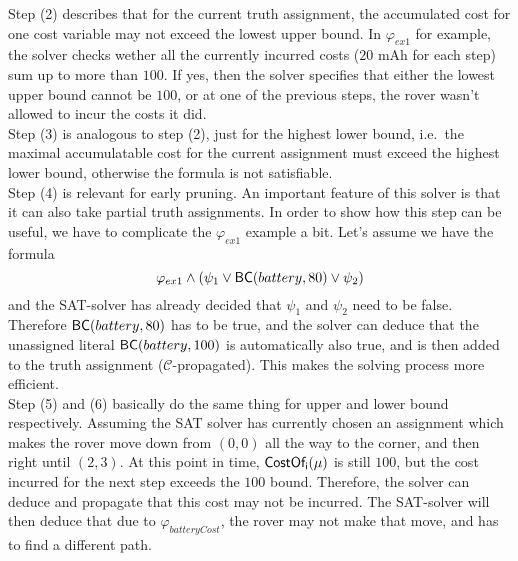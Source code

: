 \documentclass{amsart}
\theoremstyle{definition}
\theoremstyle{remark}
\numberwithin{equation}{section}
\def\C{$\mathcal{C}$}
\begin{document}
    Step (2) describes that for the current truth assignment, the accumulated cost for one cost variable may not exceed the lowest upper bound. In $\varphi_{ex1}$ for example, the solver checks wether all the currently incurred costs ($20$ mAh for each step) sum up to more than $100$. If yes, then the solver specifies that either the lowest upper bound cannot be $100$, or at one of the previous steps, the rover wasn't allowed to incur the costs it did. \\

    Step (3) is analogous to step (2), just for the highest lower bound, i.e.\ the maximal accumulatable cost for the current assignment must exceed the highest lower bound, otherwise the formula is not satisfiable. \\

    Step (4) is relevant for early pruning. An important feature of this solver is that it can also take partial truth assignments. In order to show how this step can be useful, we have to complicate the $\varphi_{ex1}$ example a bit. Let's assume we have the formula 
    \begin{equation*}
      \varphi_{ex1} \land (\psi_1 \lor \operatorname{\sf BC \rm}(battery, 80) \lor \psi_2)
    \end{equation*}
    and the SAT-solver has already decided that $\psi_1$ and $\psi_2$ need to be false. Therefore $\operatorname{\sf BC \rm}(battery, 80)$ has to be true, and the solver can deduce that the unassigned literal $\operatorname{\sf BC \rm}(battery, 100)$ is automatically also true, and is then added to the truth assignment (\C{}-propagated). This makes the solving process more efficient. \\

    Step (5) and (6) basically do the same thing for upper and lower bound respectively. Assuming the SAT solver has currently chosen an assignment which makes the rover move down from $(0,0)$ all the way to the corner, and then right until $(2,3)$. At this point in time, $\operatorname{\sf CostOf_i \rm}(\mu)$ is still $100$, but the cost incurred for the next step exceeds the $100$ bound. Therefore, the solver can deduce and propagate that this cost may not be incurred. The SAT-solver will then deduce that due to $\varphi_{batteryCost}$, the rover may not make that move, and has to find a different path.
   
  
  
\end{document}
